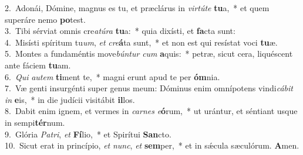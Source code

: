 {2.~}Adonái, Dómine, magnus es tu, et præclárus in \textit{vir}\textit{tú}\textit{te} \textbf{tu}a,~* et quem superáre nemo \textbf{po}test.\\
{3.~}Tibi sérviat omnis cre\textit{a}\textit{tú}\textit{ra} \textbf{tu}a:~* quia dixísti, et \textbf{fa}cta sunt:\\
{4.~}Misísti spíritum tu\textit{um}, \textit{et} \textit{cre}\textbf{á}ta sunt,~* et non est qui resístat voci \textbf{tu}æ.\\
{5.~}Montes a fundaméntis move\textit{bún}\textit{tur} \textit{cum} \textbf{a}quis:~* petræ, sicut cera, liquéscent ante fáciem \textbf{tu}am.\\
{6.~}\textit{Qui} \textit{au}\textit{tem} \textbf{ti}ment te,~* magni erunt apud te per \textbf{óm}nia.\\
{7.~}Væ genti insurgénti super genus meum: Dóminus enim omnípotens vindi\textit{cá}\textit{bit} \textit{in} \textbf{e}is,~* in die judícii visitábit \textbf{il}los.\\
{8.~}Dabit enim ignem, et vermes in \textit{car}\textit{nes} \textit{e}\textbf{ó}rum,~* ut urántur, et séntiant usque in sempi\textbf{tér}num.\\
{9.~}Glória \textit{Pa}\textit{tri}, \textit{et} \textbf{Fí}lio,~* et Spirítui \textbf{San}cto.\\
{10.~}Sicut erat in princípio, \textit{et} \textit{nunc}, \textit{et} \textbf{sem}per,~* et in sǽcula sæculórum. \textbf{A}men.\\
